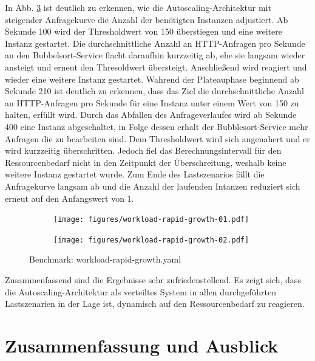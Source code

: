 \documentclass[runningheads]{llncs}
\begin{document}
In Abb. \ref{fig:benchmark_04} ist deutlich zu erkennen, wie die Autoscaling-Architektur mit steigender Anfragekurve die Anzahl der benötigten Instanzen adjustiert. Ab Sekunde 100 wird der Thresholdwert von 150 überstiegen und eine weitere Instanz gestartet. Die durchschnittliche Anzahl an HTTP-Anfragen pro Sekunde an den Bubbelsort-Service flacht daraufhin kurzzeitig ab, ehe sie langsam wieder ansteigt und erneut den Thresoldwert übersteigt. Anschließend wird reagiert und wieder eine weitere Instanz gestartet. Wahrend der Plateauphase beginnend ab Sekunde 210 ist deutlich zu erkennen, dass das Ziel die durchschnittliche Anzahl an HTTP-Anfragen pro Sekunde für eine Instanz unter einem Wert von 150 zu halten, erfüllt wird. Durch das Abfallen des Anfrageverlaufes wird ab Sekunde 400 eine Instanz abgeschaltet, in Folge dessen erhalt der Bubblesort-Service mehr Anfragen die zu bearbeiten sind. Dem Thresholdwert wird sich angenahert und er wird kurzzeitig überschritten. Jedoch fiel das Berechnungsintervall für den Ressourcenbedarf nicht in den Zeitpunkt der Überschreitung, weshalb keine weitere Instanz gestartet wurde. Zum Ende des Lastszenarios fällt die Anfragekurve langsam ab und die Anzahl der laufenden Intanzen reduziert sich erneut auf den Anfangswert von 1. \\

\begin{figure}
	\centering
	\begin{subfigure}{.5\textwidth}
		\centering
		\texttt{[image: figures/workload-rapid-growth-01.pdf]}
		\label{fig:sub1}
	\end{subfigure}%
	\begin{subfigure}{.5\textwidth}
		\centering
		\texttt{[image: figures/workload-rapid-growth-02.pdf]}
		\label{fig:sub2}
	\end{subfigure}
	\caption{Benchmark: workload-rapid-growth.yaml}
	\label{fig:benchmark_04}
\end{figure}

Zusammenfassend sind die Ergebnisse sehr zufriedenstellend. Es zeigt sich, dass die Autoscaling-Architektur als verteiltes System in allen durchgeführten Lastszenarien in der Lage ist, dynamisch auf den Ressourcenbedarf zu reagieren.

\newpage

\section{Zusammenfassung und Ausblick}
\end{document}

